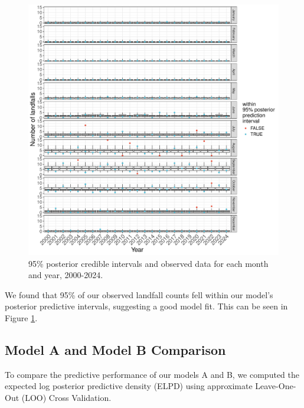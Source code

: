 \documentclass[
]{article}
\begin{document}
\begin{figure}

{\centering \includegraphics[width=1\linewidth]{../outputs/bayesian-analysis-landfall-freq/model-no-year-effect/no-year-post-pred-checks} 

}

\caption{95\% posterior credible intervals and observed data for each month and year, 2000-2024.}\label{fig:figs12}
\end{figure}

We found that 95\% of our observed landfall counts fell within our model's posterior predictive intervals, suggesting a good model fit. This can be seen in Figure \ref{fig:figs12}.

\newpage

\subsection{Model A and Model B Comparison}\label{model-a-and-model-b-comparison}

To compare the predictive performance of our models A and B, we computed the expected log posterior predictive density (ELPD) using approximate Leave-One-Out (LOO) Cross Validation.
\end{document}
